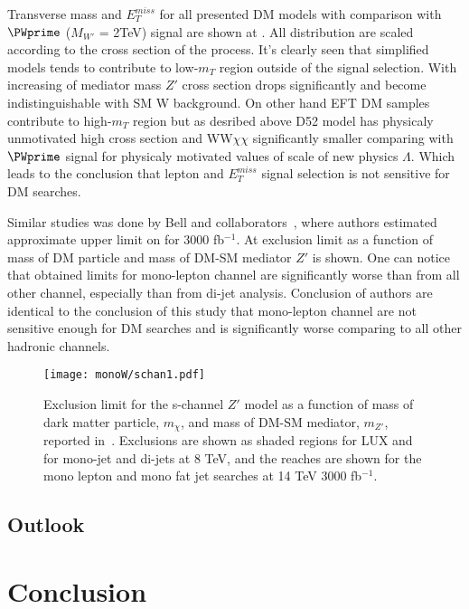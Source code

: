 Transverse mass and $E_{T}^{miss}$ for all presented DM models with comparison with $\PWprime$ ($M_{W'}$ = 2TeV) signal are shown at .
All distribution are scaled according to the cross section of the process. It's clearly seen that simplified models tends to contribute to low-$m_{T}$ region
outside of the signal selection. With increasing of mediator mass $Z'$ cross section drops significantly and become indistinguishable with SM W background.
On other hand EFT DM samples contribute to high-$m_{T}$ region but as desribed above D52 model has physicaly unmotivated high cross section and WW$\chi\chi$ 
significantly smaller comparing with $\PWprime$ signal for physicaly motivated values of scale of new physics $\Lambda$. Which leads to the conclusion that
lepton and $E_{T}^{miss}$ signal selection is not sensitive for DM searches.



Similar studies was done by Bell and collaborators~\cite{arXiv:1512.00476}, where authors estimated approximate upper limit on for 3000 fb$^{-1}$. 
At  exclusion limit
as a function of mass of DM particle and mass of DM-SM mediator $Z'$ is shown. One can notice that obtained limits for mono-lepton channel are significantly 
worse than from all other channel, especially than from di-jet analysis. Conclusion of authors are identical to the conclusion of this study that mono-lepton channel
are not sensitive enough for DM searches and is significantly worse comparing to all other hadronic channels.

\begin{figure}[hb]
 \texttt{[image: monoW/schan1.pdf]}
  \caption{Exclusion limit for the s-channel $Z'$ model as a function of mass of dark matter particle, $m_{\chi}$, 
  and mass of DM-SM mediator, $m_{Z'}$, reported in~\cite{arXiv:1512.00476}.
  Exclusions are shown as shaded regions for LUX and for mono-jet and di-jets at 8 TeV, 
  and the reaches are shown for the mono lepton and mono fat jet searches at 14 TeV 3000 fb$^{-1}$.}
  \label{fig:bellExclLim}
\end{figure}

\section{Outlook}
\label{sec:wprimeConclusion}

\chapter{Conclusion}